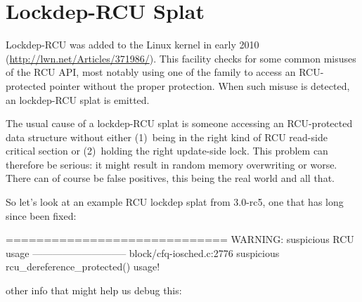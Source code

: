 
\section{Lockdep-RCU Splat}
\label{sec:rcu:Lockdep-RCU Splat}

Lockdep-RCU was added to the Linux kernel in early 2010
(\url{http://lwn.net/Articles/371986/}).
This facility checks for some common
misuses of the RCU API, most notably using one of the 
family to access an RCU-protected pointer without the proper protection.
When such misuse is detected, an lockdep-RCU splat is emitted.

The usual cause of a lockdep-RCU splat is someone accessing an
RCU-protected data structure without either (1)~being in the right kind of
RCU read-side critical section or (2)~holding the right update-side lock.
This problem can therefore be serious{:} it might result in random memory
overwriting or worse.
There can of course be false positives, this
being the real world and all that.

So let's look at an example RCU lockdep splat from 3.0-rc5, one that
has long since been fixed:

\begin{VerbatimU}[gobble=4]
    =============================
    WARNING: suspicious RCU usage
    -----------------------------
    block/cfq-iosched.c:2776 suspicious rcu_dereference_protected() usage!
\end{VerbatimU}

\noindent%
other info that might help us debug this:

